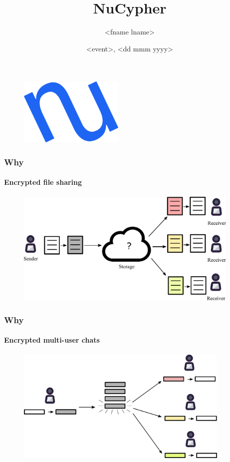 \documentclass[xetex,mathsans,sans,aspectratio=169]{beamer}
\title[NuCypher]{NuCypher}
\author[<fname lname>]{<fname lname>}
\date[<dd mmm yyyy>]{<event>, <dd mmm yyyy>}
\begin{document}
    \begin{frame}
        \titlepage
        \begin{figure}
            \centering
            \includegraphics[width=5cm]{pdf/nucypher_logo.pdf}
        \end{figure}
    \end{frame}

    \begin{frame}
        \frametitle{Why}
        \framesubtitle{Encrypted file sharing}
        \begin{figure}
            \centering
            \includegraphics[height=5.5cm]{pdf/file-sharing.pdf}
        \end{figure}
    \end{frame}

    \begin{frame}
        \frametitle{Why}
        \framesubtitle{Encrypted multi-user chats}
        \begin{figure}
            \centering
            \includegraphics[height=5.5cm]{pdf/chats.pdf}
        \end{figure}
    \end{frame}
\end{document}

